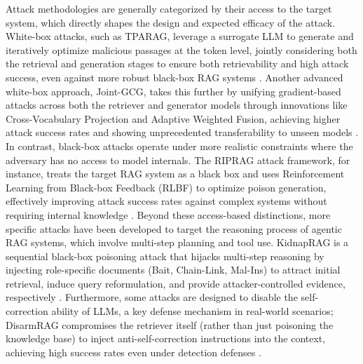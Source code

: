 \documentclass[11pt]{article}
\begin{document}
Attack methodologies are generally categorized by their access to the target system, which directly shapes the design and expected efficacy of the attack. White-box attacks, such as TPARAG, leverage a surrogate LLM to generate and iteratively optimize malicious passages at the token level, jointly considering both the retrieval and generation stages to ensure both retrievability and high attack success, even against more robust black-box RAG systems \cite{ref427}. Another advanced white-box approach, Joint-GCG, takes this further by unifying gradient-based attacks across both the retriever and generator models through innovations like Cross-Vocabulary Projection and Adaptive Weighted Fusion, achieving higher attack success rates and showing unprecedented transferability to unseen models \cite{ref428}. In contrast, black-box attacks operate under more realistic constraints where the adversary has no access to model internals. The RIPRAG attack framework, for instance, treats the target RAG system as a black box and uses Reinforcement Learning from Black-box Feedback (RLBF) to optimize poison generation, effectively improving attack success rates against complex systems without requiring internal knowledge \cite{ref429}. Beyond these access-based distinctions, more specific attacks have been developed to target the reasoning process of agentic RAG systems, which involve multi-step planning and tool use. KidnapRAG is a sequential black-box poisoning attack that hijacks multi-step reasoning by injecting role-specific documents (Bait, Chain-Link, Mal-Ins) to attract initial retrieval, induce query reformulation, and provide attacker-controlled evidence, respectively \cite{ref430}. Furthermore, some attacks are designed to disable the self-correction ability of LLMs, a key defense mechanism in real-world scenarios; DisarmRAG compromises the retriever itself (rather than just poisoning the knowledge base) to inject anti-self-correction instructions into the context, achieving high success rates even under detection defenses \cite{ref431}.
\end{document}
